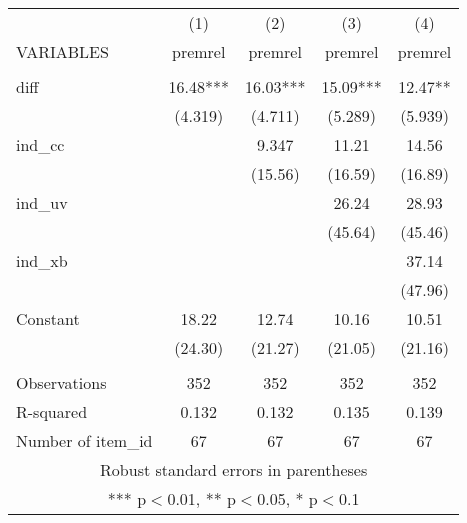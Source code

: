 \documentclass[]{article}
\begin{document}
\begin{tabular}{lcccc} \hline
 & (1) & (2) & (3) & (4) \\
VARIABLES & premrel & premrel & premrel & premrel \\ \hline
 &  &  &  &  \\
diff & 16.48*** & 16.03*** & 15.09*** & 12.47** \\
 & (4.319) & (4.711) & (5.289) & (5.939) \\
ind\_cc &  & 9.347 & 11.21 & 14.56 \\
 &  & (15.56) & (16.59) & (16.89) \\
ind\_uv &  &  & 26.24 & 28.93 \\
 &  &  & (45.64) & (45.46) \\
ind\_xb &  &  &  & 37.14 \\
 &  &  &  & (47.96) \\
Constant & 18.22 & 12.74 & 10.16 & 10.51 \\
 & (24.30) & (21.27) & (21.05) & (21.16) \\
 &  &  &  &  \\
Observations & 352 & 352 & 352 & 352 \\
R-squared & 0.132 & 0.132 & 0.135 & 0.139 \\
 Number of item\_id & 67 & 67 & 67 & 67 \\ \hline
\multicolumn{5}{c}{ Robust standard errors in parentheses} \\
\multicolumn{5}{c}{ *** p$<$0.01, ** p$<$0.05, * p$<$0.1} \\
\end{tabular}
\end{document}
